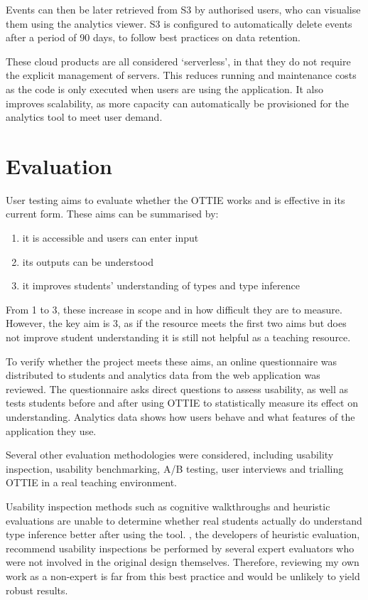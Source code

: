 \documentclass[a4paper,fleqn,oneside,12pt]{report}
\begin{document}
Events can then be later retrieved from S3 by authorised users, who can visualise them using the analytics viewer. S3 is configured to automatically delete events after a period of 90 days, to follow best practices on data retention.

These cloud products are all considered `serverless', in that they do not require the explicit management of servers. This reduces running and maintenance costs as the code is only executed when users are using the application. It also improves scalability, as more capacity can automatically be provisioned for the analytics tool to meet user demand.

\chapter{Evaluation}\label{id:h.e6letww4nhn0}

User testing aims to evaluate whether the OTTIE works and is effective in its current form. These aims can be summarised by:
\begin{enumerate}
  \item it is accessible and users can enter input
  \item its outputs can be understood
  \item it improves students' understanding of types and type inference
\end{enumerate}

From 1 to 3, these increase in scope and in how difficult they are to measure. However, the key aim is 3, as if the resource meets the first two aims but does not improve student understanding it is still not helpful as a teaching resource.

To verify whether the project meets these aims, an online questionnaire was distributed to students and analytics data from the web application was reviewed. The questionnaire asks direct questions to assess usability, as well as tests students before and after using OTTIE to statistically measure its effect on understanding. Analytics data shows how users behave and what features of the application they use.

Several other evaluation methodologies were considered, including usability inspection, usability benchmarking, A/B testing, user interviews and trialling OTTIE in a real teaching environment.

Usability inspection methods such as cognitive walkthroughs and heuristic evaluations are unable to determine whether real students actually do understand type inference better after using the tool. \cite{ref37}, the developers of heuristic evaluation, recommend usability inspections be performed by several expert evaluators who were not involved in the original design themselves. Therefore, reviewing my own work as a non-expert is far from this best practice and would be unlikely to yield robust results.
\end{document}
